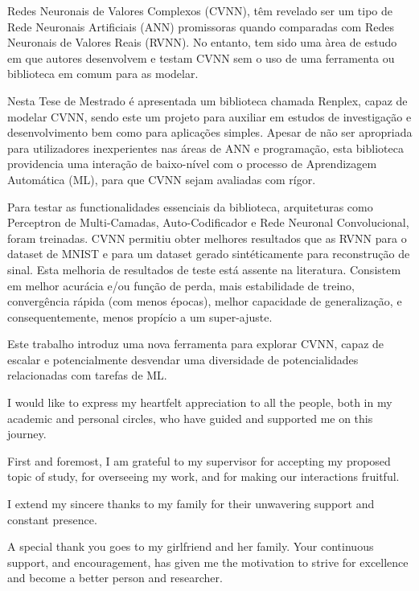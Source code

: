 \begin{abstractotherlanguage}

Redes Neuronais de Valores Complexos (CVNN), têm revelado ser um tipo de Rede Neuronais Artificiais (ANN) promissoras quando comparadas com Redes Neuronais de Valores Reais (RVNN). No entanto, tem sido uma àrea de estudo em que autores desenvolvem e testam CVNN sem o uso de uma ferramenta ou biblioteca em comum para as modelar.

Nesta Tese de Mestrado é apresentada um biblioteca chamada Renplex, capaz de modelar CVNN, sendo este um projeto para auxiliar em estudos de investigação e desenvolvimento bem como para aplicações simples. Apesar de não ser apropriada para utilizadores inexperientes nas áreas de ANN e programação, esta biblioteca providencia uma interação de baixo-nível com o processo de Aprendizagem Automática (ML), para que CVNN sejam avaliadas com rígor.

Para testar as functionalidades essenciais da biblioteca, arquiteturas como Perceptron de Multi-Camadas, Auto-Codificador e Rede Neuronal Convolucional, foram treinadas. CVNN permitiu obter melhores resultados que as RVNN para o dataset de MNIST e para um dataset gerado sintéticamente para reconstrução de sinal. Esta melhoria de resultados de teste está assente na literatura. Consistem em melhor acurácia e/ou função de perda, mais estabilidade de treino, convergência rápida (com menos épocas), melhor capacidade de generalização, e consequentemente, menos propício a um super-ajuste.

Este trabalho introduz uma nova ferramenta para explorar CVNN, capaz de escalar e potencialmente desvendar uma diversidade de potencialidades relacionadas com tarefas de ML. 

\end{abstractotherlanguage}


\begin{acknowledgements}

I would like to express my heartfelt appreciation to all the people, both in my academic and personal circles, who have guided and supported me on this journey.

First and foremost, I am grateful to my supervisor for accepting my proposed topic of study, for overseeing my work, and for making our interactions fruitful.

I extend my sincere thanks to my family for their unwavering support and constant presence. 

A special thank you goes to my girlfriend and her family. Your continuous support, and encouragement, has given me the motivation to strive for excellence and become a better person and researcher.

\end{acknowledgements}

